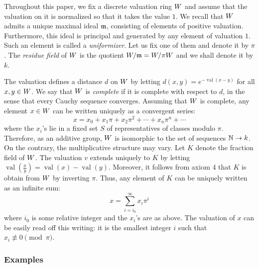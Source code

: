\documentclass{article}
\DeclareMathOperator{\val}{val}
\begin{document}
Throughout this paper, we fix a discrete valuation ring $W$ and assume 
that the valuation on it is normalized so that it takes the value $1$. 
We recall that $W$ admits a unique maximal ideal $\mathfrak m$, consisting of 
elements of positive valuation. Furthermore, this ideal is principal and 
generated by any element of valuation $1$. Such an element is called a 
\emph{uniformizer}. Let us fix one of them and denote it by $\pi$. The 
\emph{residue field} of $W$ is the quotient $W/\mathfrak m = W/\pi W$ and we 
shall denote it by $k$.

The valuation defines a distance $d$ on $W$ by letting $d(x,y) = 
e^{-\val(x-y)}$ for all $x, y \in W$. We say that $W$ is 
\emph{complete} if it is complete with respect to $d$, in the sense that 
every Cauchy sequence converges. Assuming that $W$ is complete, any 
element $x \in W$ can be written uniquely as a convergent series:
\begin{equation}
\label{eq:expandCDVR}
x = x_0 + x_1 \pi + x_2 \pi^2 + \cdots + x_n \pi^n + \cdots
\end{equation}
where the $x_i$'s lie in a fixed set $S$ of representatives of classes
modulo $\pi$. Therefore, as an additive group, $W$ is isomorphic to 
the set of sequences $\mathbb N \to k$. On the contrary, the multiplicative
structure may vary.
Let $K$ denote the fraction field of $W$. The valuation $v$ extends 
uniquely to $K$ by letting $\val(\frac x y) = \val(x) - \val(y)$. 
Moreover, it follows from axiom 4 that $K$ is obtain from $W$ by 
inverting $\pi$. Thus, any element of $K$ can be uniquely written as an 
infinite sum:
\begin{equation}
\label{eq:expandCDVF}
x = \sum_{i=i_0}^\infty x_i \pi^i
\end{equation}
where $i_0$ is some relative integer and the $x_i$'s are as above. The 
valuation of $x$ can be easily read off this writing: it is the smallest 
integer $i$ such that $x_i \not\equiv 0 \pmod \pi$.

\subsubsection*{Examples}
\end{document}
